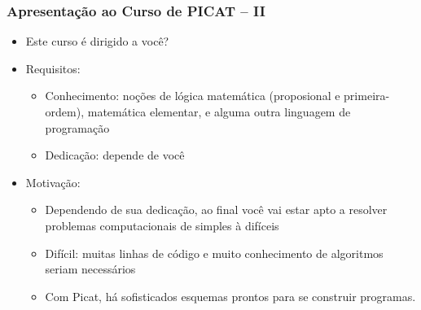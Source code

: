 \begin{frame}[fragile]
  \frametitle{Apresentação ao Curso de PICAT -- II}
  \begin{itemize}

    \item Este curso é dirigido a você?
  \pause
    \item Requisitos:
   \pause
		\begin{itemize}
			\item Conhecimento: noções de lógica matemática 
			(proposional e primeira-ordem), matemática elementar, 
			e alguma outra linguagem de programação

			\item Dedicação: depende de você
		\end{itemize}
		
  \pause
    \item Motivação:
   \pause
		\begin{itemize}
			\item Dependendo de sua dedicação, ao final você vai estar apto a resolver problemas
			computacionais de simples à difíceis

			\item Difícil: muitas linhas de código e muito conhecimento de algoritmos seriam
			necessários
			
			\item Com Picat, há sofisticados esquemas prontos para se construir programas.

		\end{itemize}

  \end{itemize}

\end{frame}


